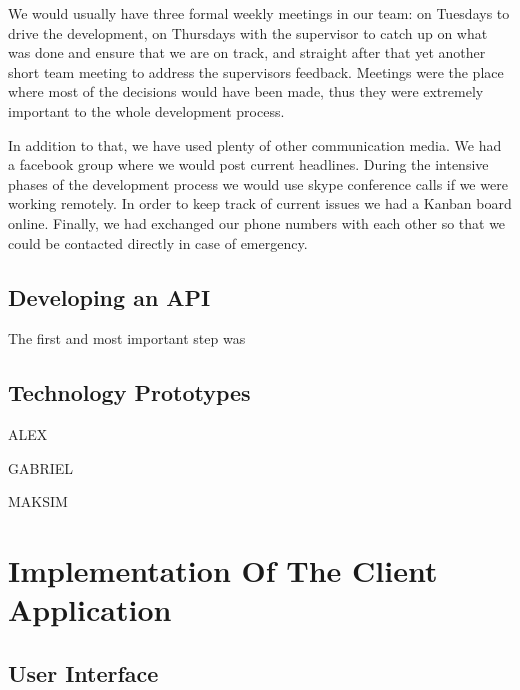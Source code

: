 \documentclass{l3proj}
\begin{document}
We would usually have three formal weekly meetings in our team: on Tuesdays to drive the development, on Thursdays with the supervisor to catch up on what was done and ensure that we are on track, and straight after that yet another short team meeting to address the supervisors feedback. Meetings were the place where most of the decisions would have been made, thus they were extremely important to the whole development process.

In addition to that, we have used plenty of other communication media. We had a facebook group where we would post current headlines. During the intensive phases of the development process we would use skype conference calls if we were working remotely. In order to keep track of current issues we had a Kanban board online. Finally, we had exchanged our phone numbers with each other so that we could be contacted directly in case of emergency.

\subsection{Developing an API}

The first and most important step was

\subsection{Technology Prototypes}


ALEX

GABRIEL

MAKSIM


\section{Implementation Of The Client Application}

\subsection{User Interface}
\end{document}
